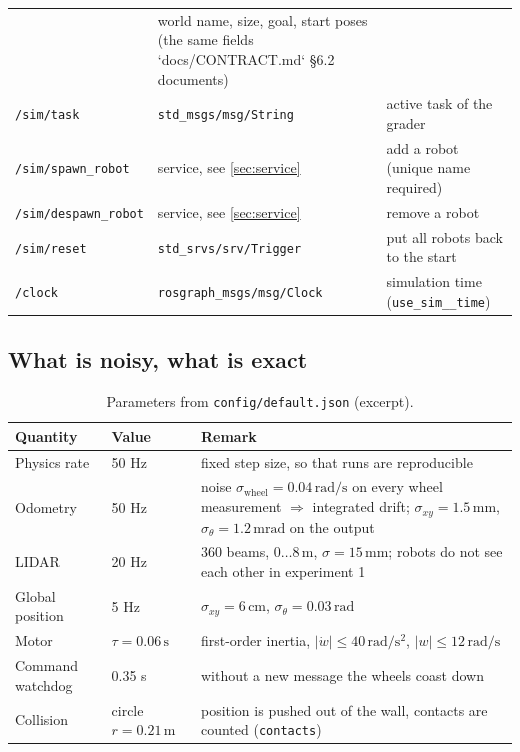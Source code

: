 \documentclass[12pt,a4paper]{scrartcl}
\newcommand{\thema}[1]{\texttt{#1}}
\newcommand{\ordner}[1]{\texttt{#1}}
\begin{document}
\begin{table}[ht]
\begin{tabular}{@{}p{4.3cm}p{4.9cm}p{5.2cm}@{}}
  & world name, size, goal, start poses (the same fields `docs/CONTRACT.md` §6.2 documents) \\
\thema{/sim/task} & \thema{std\_msgs/msg/String}
  & active task of the grader \\
\thema{/sim/spawn\_robot} & service, see \cref{sec:service}
  & add a robot (unique name required) \\
\thema{/sim/despawn\_robot} & service, see \cref{sec:service}
  & remove a robot \\
\thema{/sim/reset} & \thema{std\_srvs/srv/Trigger} & put all robots back to the start \\
\thema{/clock} & \thema{rosgraph\_msgs/msg/Clock} & simulation time (\thema{use\_sim\_\_time}) \\
\bottomrule
\end{tabular}
\end{table}

\subsection{What is noisy, what is exact}
\begin{table}[ht]\centering\small
\caption{Parameters from \ordner{config/default.json} (excerpt).}
\label{tab:parameter}
\begin{tabular}{@{}llp{7.3cm}@{}}
\toprule
Quantity & Value & Remark \\
\midrule
Physics rate & 50 Hz & fixed step size, so that runs are reproducible \\
Odometry & 50 Hz & noise \(\sigma_{\text{wheel}}=0.04\,\mathrm{rad/s}\) on
  every wheel measurement \(\Rightarrow\) integrated drift; \(\sigma_{xy}=1.5\,\mathrm{mm}\),
  \(\sigma_\theta=1.2\,\mathrm{mrad}\) on the output \\
LIDAR & 20 Hz & 360 beams, \(0\ldots8\,\mathrm{m}\), \(\sigma=15\,\mathrm{mm}\);
  robots do not see each other in experiment 1 \\
Global position & 5 Hz & \(\sigma_{xy}=6\,\mathrm{cm}\), \(\sigma_\theta=0.03\,\mathrm{rad}\) \\
Motor & \(\tau=0.06\,\mathrm{s}\) & first-order inertia,
  \(|\dot w|\le 40\,\mathrm{rad/s^2}\), \(|w|\le 12\,\mathrm{rad/s}\) \\
Command watchdog & 0.35 s & without a new message the wheels coast down \\
Collision & circle \(r=0.21\,\mathrm{m}\) & position is pushed out of the wall,
  contacts are counted (\thema{contacts}) \\
\bottomrule
\end{tabular}
\end{table}
\end{document}
